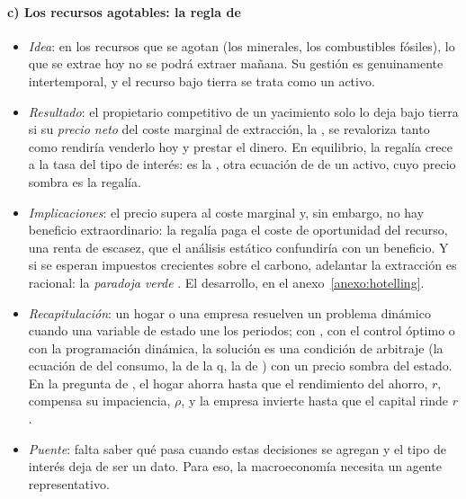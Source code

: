 \documentclass[11pt]{article}
\begin{document}
\paragraph{c) Los recursos agotables: la regla de }

\begin{itemize}
\item \emph{Idea}: en los recursos que se agotan (los minerales, los combustibles fósiles), lo que se extrae hoy no se podrá extraer mañana. Su gestión es genuinamente intertemporal, y el recurso bajo tierra se trata como un activo.
\item \emph{Resultado}\nocite{Hotelling1931Economics}: el propietario competitivo de un yacimiento solo lo deja bajo tierra si su \emph{precio neto} del coste marginal de extracción, la , se revaloriza tanto como rendiría venderlo hoy y prestar el dinero. En equilibrio, la regalía crece a la tasa del tipo de interés: es la , otra ecuación de  de un activo, cuyo precio sombra es la regalía.
\item \emph{Implicaciones}: el precio supera al coste marginal y, sin embargo, no hay beneficio extraordinario: la regalía paga el coste de oportunidad del recurso, una renta de escasez, que el análisis estático confundiría con un beneficio. Y si se esperan impuestos crecientes sobre el carbono, adelantar la extracción es racional: la \emph{paradoja verde} . El desarrollo, en el anexo~\ref{anexo:hotelling}.
\end{itemize}

\begin{itemize}
\item \emph{Recapitulación}: un hogar o una empresa resuelven un problema dinámico cuando una variable de estado une los periodos; con , con el control óptimo o con la programación dinámica, la solución es una condición de arbitraje (la ecuación de  del consumo, la de la q, la de ) con un precio sombra del estado. En la pregunta de , el hogar ahorra hasta que el rendimiento del ahorro, $r$, compensa su impaciencia, $\rho$, y la empresa invierte hasta que el capital rinde $r$.
\item \emph{Puente}: falta saber qué pasa cuando estas decisiones se agregan y el tipo de interés deja de ser un dato. Para eso, la macroeconomía necesita un agente representativo.
\end{itemize}
\end{document}
